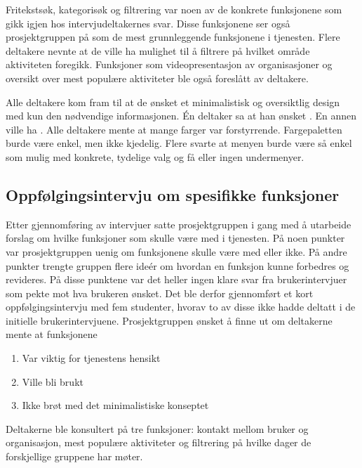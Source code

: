 Fritekstsøk, kategorisøk og filtrering var noen av de konkrete funksjonene som gikk igjen hos intervjudeltakernes svar. Disse funksjonene ser også prosjektgruppen på som de mest grunnleggende funksjonene i tjenesten. Flere deltakere nevnte at de ville ha mulighet til å filtrere på hvilket område aktiviteten foregikk. Funksjoner som videopresentasjon av organisasjoner og oversikt over mest populære aktiviteter ble også foreslått av deltakere.

Alle deltakere kom fram til at de ønsket et minimalistisk og oversiktlig design med kun den nødvendige informasjonen. Én deltaker sa at han ønsket . En annen ville ha . Alle deltakere mente at mange farger var forstyrrende. Fargepaletten burde være enkel, men ikke kjedelig. Flere svarte at menyen burde være så enkel som mulig med konkrete, tydelige valg og få eller ingen undermenyer.

\subsection{Oppfølgingsintervju om spesifikke funksjoner}
Etter gjennomføring av intervjuer satte prosjektgruppen i gang med å utarbeide forslag om hvilke funksjoner som skulle være med i tjenesten. På noen punkter var prosjektgruppen uenig om funksjonene skulle være med eller ikke. På andre punkter trengte gruppen flere ideér om hvordan en funksjon kunne forbedres og revideres. På disse punktene var det heller ingen klare svar fra brukerintervjuer som pekte mot hva brukeren ønsket. Det ble derfor gjennomført et kort oppfølgingsintervju med fem studenter, hvorav to av disse ikke hadde deltatt i de initielle brukerintervjuene. Prosjektgruppen ønsket å finne ut om deltakerne mente at funksjonene

\begin{enumerate}
\item Var viktig for tjenestens hensikt
\item Ville bli brukt
\item Ikke brøt med det minimalistiske konseptet
\end{enumerate}

Deltakerne ble konsultert på tre funksjoner: kontakt mellom bruker og organisasjon, mest populære aktiviteter og filtrering på hvilke dager de forskjellige gruppene har møter.

